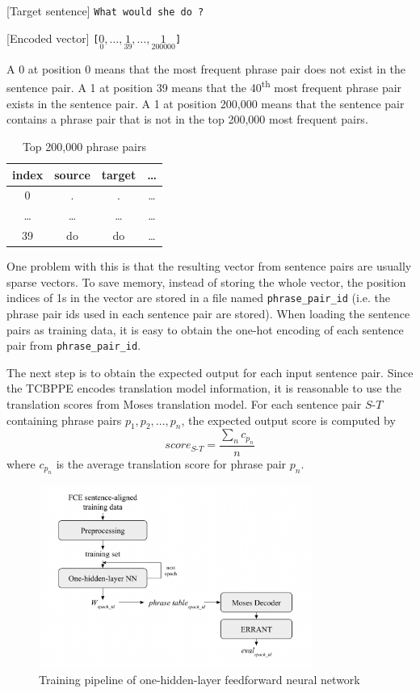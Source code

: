 \documentclass[12pt,a4paper,twoside,openright]{report}
\begin{document}
[Target sentence]
\texttt{What would she do ?}

[Encoded vector]
\texttt{[$\underset{0}{0}, \ldots, \underset{39}{1}, \ldots, \underset{200000}{1}$]}

A 0 at position 0 means that the most frequent phrase pair does not exist in the sentence pair. A 1 at position 39 means that the 40\textsuperscript{th} most frequent phrase pair exists in the sentence pair. A 1 at position 200,000 means that the sentence pair contains a phrase pair that is not in the top 200,000 most frequent pairs.

\begin{table}[h!]
\centering
\begin{tabular}{ |c|c|c|c| } 
 \hline
 index & source & target & \ldots \\ [0.5ex] 
 \hline
 0 & . & . & \ldots \\ 
 \ldots & \ldots & \ldots & \ldots \\ 
 39 & do & do & \ldots \\ 
 \hline
\end{tabular}
\caption{Top 200,000 phrase pairs}
\label{table:pt_top_exmaple}
\end{table}

One problem with this is that the resulting vector from sentence pairs are usually sparse vectors. To save memory, instead of storing the whole vector, the position indices of 1s in the vector are stored in a file named \texttt{phrase\_pair\_id} (i.e. the phrase pair ids used in each sentence pair are stored). When loading the sentence pairs as training data, it is easy to obtain the one-hot encoding of each sentence pair from \texttt{phrase\_pair\_id}.

The next step is to obtain the expected output for each input sentence pair. Since the TCBPPE encodes translation model information, it is reasonable to use the translation scores from Moses translation model. For each sentence pair $S\textrm{-}T$ containing phrase pairs $p_1, p_2, ..., p_n$, the expected output score is computed by
\[ score_{S\textrm{-}T} = \frac{\sum_n c_{p_n}}{n} \]
where $c_{p_n}$ is the average translation score for phrase pair $p_n$.

\begin{figure}[ht]
\centering
\includegraphics[width=0.8\textwidth]{images/sparse_pipeline.png}
\caption{Training pipeline of one-hidden-layer feedforward neural network}
\label{fig:sparse_pipeline}
\end{figure}
\end{document}
